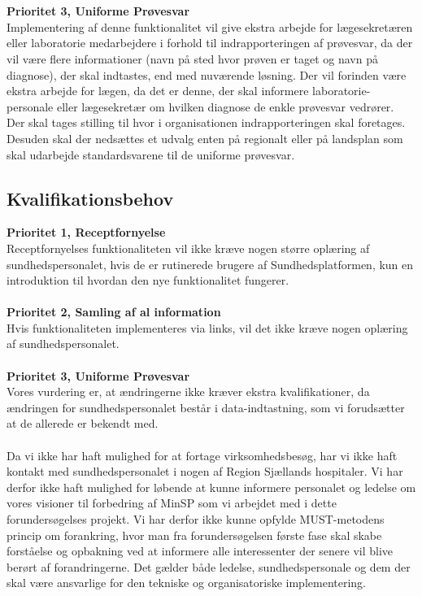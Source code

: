 \\\\
\textbf{Prioritet 3, Uniforme Prøvesvar} \\
Implementering af denne funktionalitet vil give ekstra arbejde for lægesekretæren eller laboratorie medarbejdere i forhold til indrapporteringen af prøvesvar, da der vil være flere informationer (navn på sted hvor prøven er taget og navn på diagnose), der skal indtastes, end med nuværende løsning. Der vil forinden være ekstra arbejde for lægen, da det er denne, der skal informere laboratorie-personale eller lægesekretær om hvilken diagnose de enkle prøvesvar vedrører.\\
Der skal tages stilling til hvor i organisationen indrapporteringen skal foretages. Desuden skal der nedsættes et udvalg enten på regionalt eller på landsplan som skal udarbejde standardsvarene til de uniforme prøvesvar.
\subsection{Kvalifikationsbehov}
\textbf{Prioritet 1, Receptfornyelse} \\
Receptfornyelses funktionaliteten vil ikke kræve nogen større oplæring af sundhedspersonalet, hvis de er rutinerede brugere af Sundhedsplatformen, kun en introduktion til hvordan den nye funktionalitet fungerer.
\\\\
\textbf{Prioritet 2, Samling af al information} \\
Hvis funktionaliteten implementeres via links, vil det ikke kræve nogen oplæring af sundhedspersonalet.
\\\\
\textbf{Prioritet 3, Uniforme Prøvesvar} \\
Vores vurdering er, at ændringerne ikke kræver ekstra kvalifikationer, da ændringen for sundhedspersonalet består i data-indtastning, som vi forudsætter at de allerede er bekendt med.
\\\\
Da vi ikke har haft mulighed for at fortage virksomhedsbesøg, har vi ikke haft kontakt med sundhedspersonalet i nogen af Region Sjællands hospitaler. Vi har derfor ikke haft mulighed for løbende at kunne informere personalet og ledelse om vores visioner til forbedring af MinSP som vi arbejdet med i dette forundersøgelses projekt. Vi har derfor ikke kunne opfylde MUST-metodens princip om forankring, hvor man fra forundersøgelsen første fase skal skabe forståelse og opbakning ved at informere alle interessenter der senere vil blive berørt af forandringerne. Det gælder både ledelse, sundhedspersonale og dem der skal være ansvarlige for den tekniske og organisatoriske implementering.